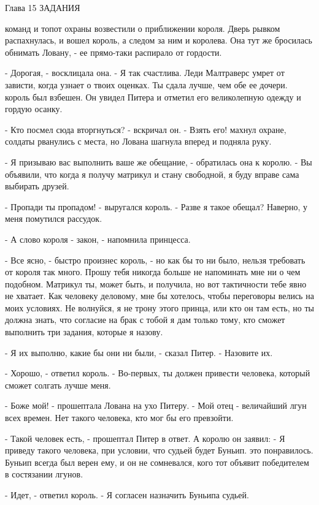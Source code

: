 Глава 15
 ЗАДАНИЯ
\par{} команд и топот охраны возвестили о приближении короля. Дверь 
рывком распахнулась, и вошел король, а следом за ним и королева. Она 
тут же бросилась обнимать Ловану, - ее прямо-таки распирало от 
гордости.
\par- Дорогая, - восклицала она. - Я так счастлива. Леди Малтраверс 
умрет от зависти, когда узнает о твоих оценках. Ты сдала лучше, чем 
обе ее дочери.
 король был взбешен. Он увидел Питера и отметил его великолепную 
одежду и гордую осанку.
\par- Кто посмел сюда вторгнуться? - вскричал он. - Взять его!
 махнул охране, солдаты рванулись с места, но Лована шагнула 
вперед и подняла руку.
\par- Я призываю вас выполнить ваше же обещание, - обратилась она к 
королю. - Вы объявили, что когда я получу матрикул и стану свободной, 
я буду вправе сама выбирать друзей.
\par- Пропади ты пропадом! - выругался король. - Разве я такое обещал? 
Наверно, у меня помутился рассудок.
\par- А слово короля - закон, - напомнила принцесса.
\par- Все ясно, - быстро произнес король, - но как бы то ни было, 
нельзя требовать от короля так много. Прошу тебя никогда больше не 
напоминать мне ни о чем подобном. Матрикул ты, может быть, и получила, 
но вот тактичности тебе явно не хватает. Как человеку деловому, мне бы 
хотелось, чтобы переговоры велись на моих условиях. Не волнуйся, я не 
трону этого принца, или кто он там есть, но ты должна знать, что 
согласие на брак с тобой я дам только тому, кто сможет выполнить три 
задания, которые я назову.
\par- Я их выполню, какие бы они ни были, - сказал Питер. - Назовите 
их.
\par- Хорошо, - ответил король. - Во-первых, ты должен привести 
человека, который сможет солгать лучше меня.
\par- Боже мой! - прошептала Лована на ухо Питеру. - Мой отец - 
величайший лгун всех времен. Нет такого человека, кто мог бы его 
превзойти.
\par- Такой человек есть, - прошептал Питер в ответ. А королю он 
заявил: - Я приведу такого человека, при условии, что судьей будет 
Буньип.
 это понравилось. Буньип всегда был верен ему, и он не 
сомневался, кого тот объявит победителем в состязании лгунов.
\par- Идет, - ответил король. - Я согласен назначить Буньипа судьей.
